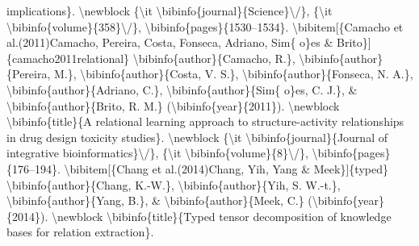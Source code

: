 \documentclass{article}%
\begin{document}
implications\}.\newline%
\textbackslash{}newblock \{\textbackslash{}it \textbackslash{}bibinfo\{journal\}\{Science\}\textbackslash{}/\}, \{\textbackslash{}it \textbackslash{}bibinfo\{volume\}\{358\}\textbackslash{}/\},\newline%
\textbackslash{}bibinfo\{pages\}\{1530–1534\}.\newline%
\textbackslash{}bibitem{[}\{Camacho et al.(2011)Camacho, Pereira, Costa, Fonseca, Adriano,\newline%
Sim\{ o\}es \& Brito\}{]}\{camacho2011relational\}\newline%
\textbackslash{}bibinfo\{author\}\{Camacho, R.\}, \textbackslash{}bibinfo\{author\}\{Pereira, M.\},\newline%
\textbackslash{}bibinfo\{author\}\{Costa, V. S.\}, \textbackslash{}bibinfo\{author\}\{Fonseca, N. A.\},\newline%
\textbackslash{}bibinfo\{author\}\{Adriano, C.\}, \textbackslash{}bibinfo\{author\}\{Sim\{ o\}es, C. J.\}, \&\newline%
\textbackslash{}bibinfo\{author\}\{Brito, R. M.\} (\textbackslash{}bibinfo\{year\}\{2011\}).\newline%
\textbackslash{}newblock \textbackslash{}bibinfo\{title\}\{A relational learning approach to structure{-}activity\newline%
relationships in drug design toxicity studies\}.\newline%
\textbackslash{}newblock \{\textbackslash{}it \textbackslash{}bibinfo\{journal\}\{Journal of integrative bioinformatics\}\textbackslash{}/\},\newline%
\{\textbackslash{}it \textbackslash{}bibinfo\{volume\}\{8\}\textbackslash{}/\}, \textbackslash{}bibinfo\{pages\}\{176–194\}.\newline%
\textbackslash{}bibitem{[}\{Chang et al.(2014)Chang, Yih, Yang \& Meek\}{]}\{typed\}\newline%
\textbackslash{}bibinfo\{author\}\{Chang, K.{-}W.\}, \textbackslash{}bibinfo\{author\}\{Yih, S. W.{-}t.\},\newline%
\textbackslash{}bibinfo\{author\}\{Yang, B.\}, \& \textbackslash{}bibinfo\{author\}\{Meek, C.\}\newline%
(\textbackslash{}bibinfo\{year\}\{2014\}).\newline%
\textbackslash{}newblock \textbackslash{}bibinfo\{title\}\{Typed tensor decomposition of knowledge bases for\newline%
relation extraction\}.\newline%
\end{document}
